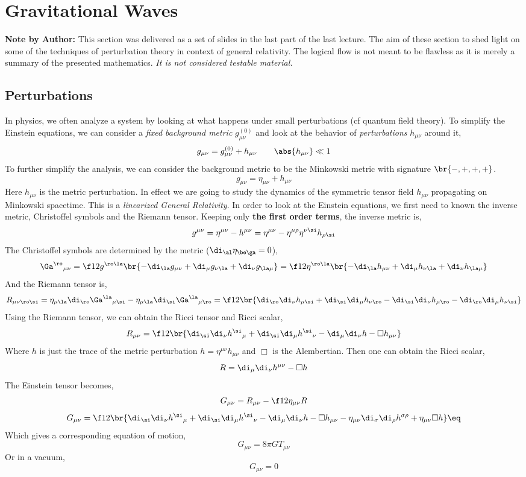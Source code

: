 \documentclass{article}
\begin{document}
\section{Gravitational Waves}
\begin{adjustwidth}{0.5in}{0.5in}
\textbf{Note by Author:} This section was delivered as a set of slides in the last part of the last lecture. The aim of these section to shed light on some of the techniques of perturbation theory in context of general relativity. The logical flow is not meant to be flawless as it is merely a summary of the presented mathematics. \textit{It is not considered testable material.}
\end{adjustwidth}
\subsection{Perturbations}
In physics, we often analyze a system by looking at what happens under small perturbations (cf quantum field theory). To simplify the Einstein equations, we can consider a \textit{fixed background metric} $g_{\mu\nu}^{(0)}$ and look at the behavior of \textit{perturbations} $h_{\mu\nu}$ around it,
\[ g_{\mu\nu} = g_{\mu\nu}^{(0)} + h_{\mu\nu} \qquad \abs{h_{\mu\nu}} \ll 1\]
To further simplify the analysis, we can consider the background metric to be the Minkowski metric with signature $\br{-,+,+,+}$.
\[ g_{\mu\nu} = \eta_{\mu\nu} + h_{\mu\nu} \]
Here $h_{\mu\nu}$ is the metric perturbation. In effect we are going to study the dynamics of the symmetric tensor field $h_{\mu\nu}$ propagating on Minkowski spacetime. This is a \textit{linearized General Relativity}. In order to look at the Einstein equations, we first need to known the inverse metric, Christoffel symbols and the Riemann tensor. Keeping only \textbf{the first order terms}, the inverse metric is,
\[ g^{\mu\nu} = \eta^{\mu\nu} - h^{\mu\nu} = \eta^{\mu\nu} - \eta^{\mu\rho}\eta^{\nu\si}h_{\rho\si} \]
The Christoffel symbols are determined by the metric ($\di_\al \eta_{\be\ga} = 0$),
\[ {\Ga^{\ro}}_{\mu\nu} = \f12 g^{\ro\la}\br{- \di_\la g_{\mu\nu} + \di_\mu g_{\nu\la} + \di_\nu g_{\la\mu}} = \f12 \eta^{\ro\la}\br{- \di_\la h_{\mu\nu} + \di_\mu h_{\nu\la} + \di_\nu h_{\la\mu}} \]
And the Riemann tensor is,
\[ R_{\mu\nu \ro \si} = \eta_{\mu\la}\di_{\ro}{\Ga^{\la}}_{\mu\si} - \eta_{\mu\la}\di_{\si}{\Ga^{\la}}_{\mu\ro} = \f12 \br{\di_\ro \di_\nu h_{\mu\si} + \di_\si \di_\mu h_{\nu\ro}- \di_\si \di_\nu h_{\mu\ro} -\di_\ro \di_\mu h_{\nu\si}} \]
Using the Riemann tensor, we can obtain the Ricci tensor and Ricci scalar,
\[ R_{\mu\nu} = \f12 \br{\di_\si \di_\nu {h^{\si}}_{\mu} + \di_\si \di_\mu {h^{\si}}_{\nu} - \di_\mu \di_\nu h - \Box h_{\mu\nu}} \]
Where $h$ is just the trace of the metric perturbation $h = \eta^{\mu\nu}h_{\mu\nu}$ and $\Box$ is the Alembertian. Then one can obtain the Ricci scalar,
\[ R = \di_\mu\di_\nu h^{\mu\nu} - \Box h \]
The Einstein tensor becomes,
\[ G_{\mu\nu} = R_{\mu\nu} - \f12\eta_{\mu\nu}R \]
\[ G_{\mu\nu} = \f12\br{\di_\si \di_\nu {h^{\si}}_{\mu} + \di_\si \di_\mu {h^{\si}}_{\nu} - \di_\mu \di_\nu h - \Box h_{\mu\nu} -\eta_{\mu\nu}\di_\sigma\di_\rho h^{\sigma\rho} + \eta_{\mu\nu}\Box h} \eq \label{eq:linein}\]
Which gives a corresponding equation of motion,
\[ G_{\mu\nu} = 8\pi G T_{\mu\nu} \]
Or in a vacuum,
\[ G_{\mu\nu} = 0 \]
\end{document}
